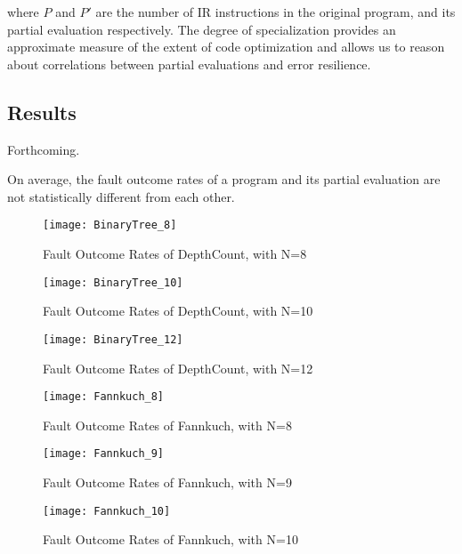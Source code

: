 where $P$ and $P'$ are the number of IR instructions in the original program, and its partial evaluation respectively.
The degree of specialization provides an approximate measure of the extent of code optimization and allows us to reason about correlations between partial evaluations and error resilience.


\subsection{Results}
\label{sec:results}
Forthcoming.

\begin{obs}
  \label{obs:density}
  On average, the fault outcome rates of a program and its partial evaluation are not statistically different from each other.
\end{obs}

\begin{figure}[htbp]
  \centering
  \texttt{[image: BinaryTree\_8]}
  \caption{Fault Outcome Rates of DepthCount, with N=8}
  \label{fig:BinaryTree_8}
\end{figure}

\begin{figure}[htbp]
  \centering
  \texttt{[image: BinaryTree\_10]}
  \caption{Fault Outcome Rates of DepthCount, with N=10}
  \label{fig:BinaryTree_10}
\end{figure}

\begin{figure}[htbp]
  \centering
  \texttt{[image: BinaryTree\_12]}
  \caption{Fault Outcome Rates of DepthCount, with N=12}
  \label{fig:BinaryTree_12}
\end{figure}

\begin{figure}[htbp]
  \centering
  \texttt{[image: Fannkuch\_8]}
  \caption{Fault Outcome Rates of Fannkuch, with N=8}
  \label{fig:Fannkuch_8}
\end{figure}

\begin{figure}[htbp]
  \centering
  \texttt{[image: Fannkuch\_9]}
  \caption{Fault Outcome Rates of Fannkuch, with N=9}
  \label{fig:Fannkuch_9}
\end{figure}

\begin{figure}[htbp]
  \centering
  \texttt{[image: Fannkuch\_10]}
  \caption{Fault Outcome Rates of Fannkuch, with N=10}
  \label{fig:Fannkuch_10}
\end{figure}

